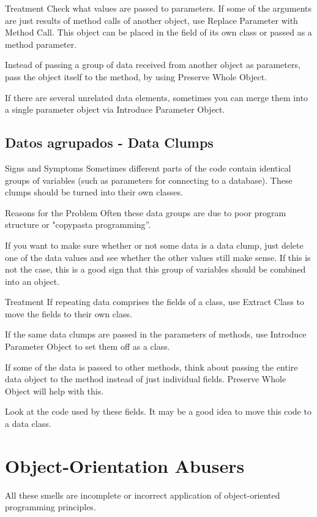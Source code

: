 \documentclass[11pt,a4paper,oneside]{book}
\begin{document}
Treatment
Check what values are passed to parameters. If some of the arguments are just results of method calls of another object, use Replace Parameter with Method Call. This object can be placed in the field of its own class or passed as a method parameter.

Instead of passing a group of data received from another object as parameters, pass the object itself to the method, by using Preserve Whole Object.

If there are several unrelated data elements, sometimes you can merge them into a single parameter object via Introduce Parameter Object.

\subsection{Datos agrupados -   Data Clumps}
\label{dataclumps}

    Signs and Symptoms
Sometimes different parts of the code contain identical groups of variables (such as parameters for connecting to a database). These clumps should be turned into their own classes.


Reasons for the Problem
Often these data groups are due to poor program structure or "copypasta programming”.

If you want to make sure whether or not some data is a data clump, just delete one of the data values and see whether the other values still make sense. If this is not the case, this is a good sign that this group of variables should be combined into an object.

Treatment
If repeating data comprises the fields of a class, use Extract Class to move the fields to their own class.

If the same data clumps are passed in the parameters of methods, use Introduce Parameter Object to set them off as a class.

If some of the data is passed to other methods, think about passing the entire data object to the method instead of just individual fields. Preserve Whole Object will help with this.

Look at the code used by these fields. It may be a good idea to move this code to a data class.
    
    
    



\section{Object-Orientation Abusers} 
\label{Object-OrientationAbusers}
All these smells are incomplete or incorrect application of object-oriented programming principles.
    \newline
    
\end{document}
